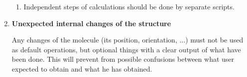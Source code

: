 \begin{enumerate}
\begin{enumerate}
            \item Independent steps of calculations should be done by separate scripts.


        \end{enumerate}


    \item \textbf{Unexpected internal changes of the structure}

    Any changes of the molecule (its position, orientation, ...) must not be
    used as default operations, but optional things with a clear output of what
    have been done. This will prevent from possible confusions between what user
    expected to obtain and what he has obtained.


\end{enumerate}
